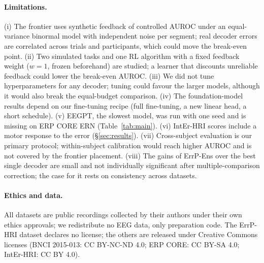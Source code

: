 \paragraph{Limitations.}
(i) The frontier uses synthetic feedback of controlled AUROC under an equal-variance binormal model with
independent noise per segment; real decoder errors are correlated across trials and participants, which could
move the break-even point. (ii) Two simulated tasks and one RL algorithm with a fixed feedback weight
($w=1$, frozen beforehand) are studied; a learner that discounts unreliable feedback could lower the
break-even AUROC. (iii) We did not tune hyperparameters for any decoder; tuning could favour the larger
models, although it would also break the equal-budget comparison. (iv) The foundation-model results depend on
our fine-tuning recipe (full fine-tuning, a new linear head, a short schedule). (v) EEGPT, the slowest model,
was run with one seed and is missing on ERP CORE ERN (Table~\ref{tab:main}). (vi) IntEr-HRI scores include a motor
response to the error (\S\ref{sec:results}). (vii) Cross-subject evaluation is our primary protocol; within-subject
calibration would reach higher AUROC and is not covered by the frontier placement. (viii) The gains of ErrP-Ens over the best single decoder are small and not individually significant
after multiple-comparison correction; the case for it rests on consistency across datasets.

\paragraph{Ethics and data.} All datasets are public recordings collected by their authors under their own
ethics approvals; we redistribute no EEG data, only preparation code. The ErrP-HRI dataset declares no
license; the others are released under Creative Commons licenses (BNCI 2015-013: CC BY-NC-ND 4.0; ERP CORE:
CC BY-SA 4.0; IntEr-HRI: CC BY 4.0).
